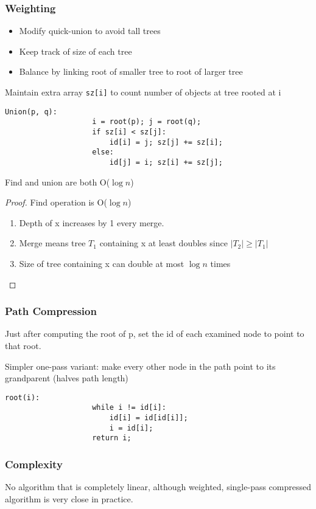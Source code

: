 \documentclass[11pt]{article}
\begin{document}
		\subsubsection{Weighting}
			\begin{itemize}
				\item Modify quick-union to avoid tall trees
				\item Keep track of size of each tree
				\item Balance by linking root of smaller tree to root of larger tree
			\end{itemize}
			Maintain extra array \verb|sz[i]| to count number of objects at tree rooted at i
			\begin{lstlisting}[autogobble=true]
				Union(p, q):
					i = root(p); j = root(q);
					if sz[i] < sz[j]:
						id[i] = j; sz[j] += sz[i];
					else:
						id[j] = i; sz[i] += sz[j];
			\end{lstlisting}
			Find and union are both O($\log n$)
			
			\begin{proof}
			Find operation is O($\log n$)
				\begin{enumerate}
					\item Depth of x increases by 1 every merge.
					\item Merge means tree $T_1$ containing x at least doubles since $|T_2| \geq |T_1|$
					\item Size of tree containing x can double at most $\log n$ times
				\end{enumerate}
			\end{proof}
		
		\subsubsection{Path Compression}
		
			Just after computing the root of p, set the id of each examined node to point to that root.
			
			Simpler one-pass variant: make every other node in the path point to its grandparent (halves path length)
			
			\begin{lstlisting}[autogobble=true]
				root(i):
					while i != id[i]:
						id[i] = id[id[i]];
						i = id[i];
					return i;
			\end{lstlisting}
			
		\subsubsection{Complexity}
			No algorithm that is completely linear, although weighted, single-pass compressed algorithm is very close in practice.
			
\end{document}
